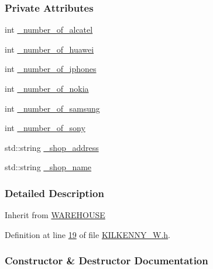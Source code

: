 \subsubsection*{Private Attributes}
\begin{DoxyCompactItemize}
\item 
int \hyperlink{class_k_i_l_k_e_n_n_y___w_ab1523ca2daf22c518edb3be585485b16_ab1523ca2daf22c518edb3be585485b16}{\+\_\+number\+\_\+of\+\_\+alcatel}
\item 
int \hyperlink{class_k_i_l_k_e_n_n_y___w_a5aedbf8c3815df0d35a94ed9105f6574_a5aedbf8c3815df0d35a94ed9105f6574}{\+\_\+number\+\_\+of\+\_\+huawei}
\item 
int \hyperlink{class_k_i_l_k_e_n_n_y___w_a91935316f3da1d18589f7d02ec0ac24c_a91935316f3da1d18589f7d02ec0ac24c}{\+\_\+number\+\_\+of\+\_\+iphones}
\item 
int \hyperlink{class_k_i_l_k_e_n_n_y___w_a717b79aedec8f4f76269fc0e83bcd2eb_a717b79aedec8f4f76269fc0e83bcd2eb}{\+\_\+number\+\_\+of\+\_\+nokia}
\item 
int \hyperlink{class_k_i_l_k_e_n_n_y___w_abf89dc9f1d933e77c3597d2835c692a0_abf89dc9f1d933e77c3597d2835c692a0}{\+\_\+number\+\_\+of\+\_\+samsung}
\item 
int \hyperlink{class_k_i_l_k_e_n_n_y___w_a9b12aacf712ccf9e082daf450bbfbe8d_a9b12aacf712ccf9e082daf450bbfbe8d}{\+\_\+number\+\_\+of\+\_\+sony}
\item 
std\+::string \hyperlink{class_k_i_l_k_e_n_n_y___w_a278c416a60d21ee6ffa400f6d1348fd5_a278c416a60d21ee6ffa400f6d1348fd5}{\+\_\+shop\+\_\+address}
\item 
std\+::string \hyperlink{class_k_i_l_k_e_n_n_y___w_a3ca31fe82131bef3b13759e6d8b9a83b_a3ca31fe82131bef3b13759e6d8b9a83b}{\+\_\+shop\+\_\+name}
\end{DoxyCompactItemize}


\subsubsection{Detailed Description}
Inherit from \hyperlink{class_w_a_r_e_h_o_u_s_e}{W\+A\+R\+E\+H\+O\+U\+SE} 

Definition at line \hyperlink{_k_i_l_k_e_n_n_y___w_8h_source_l00019}{19} of file \hyperlink{_k_i_l_k_e_n_n_y___w_8h_source}{K\+I\+L\+K\+E\+N\+N\+Y\+\_\+\+W.\+h}.



\subsubsection{Constructor \& Destructor Documentation}
